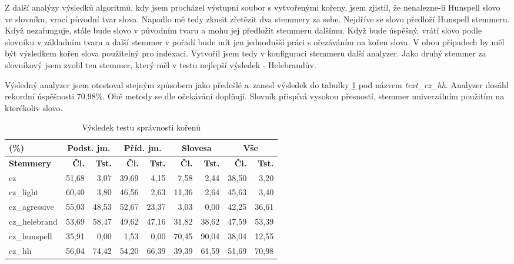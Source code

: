 Z další analýzy výsledků algoritmů, kdy jsem procházel výstupní soubor s vytvořenými kořeny, jsem zjistil, že nenalezne-li Hunspell slovo ve slovníku, vrací původní tvar slova. Napadlo mě tedy zkusit zřetězit dva stemmery za sebe. Nejdříve se slovo předloží Hunspell stemmeru. Když nezafunguje, stále bude slovo v původním tvaru a mohu jej předložit stemmeru dalšímu. Když bude úspěšný, vrátí slovo podle slovníku v základním tvaru a další stemmer v pořadí bude mít jen jednodušší práci s ořezáváním na kořen slova. V obou případech by měl být výsledkem kořen slova použitelný pro indexaci. Vytvořil jsem tedy v konfiguraci stemmeru další analyzer. Jako druhý stemmer za slovníkový jsem zvolil ten stemmer, který měl v testu nejlepší výsledek - Helebrandův.

Výsledný analyzer jsem otestoval stejným způsobem jako předešlé a~zanesl výsledek do tabulky \ref{tab:test_stm} pod názvem \emph{text\_cz\_hh}. Analyzer dosáhl rekordní úspěšnosti 70,98\%. Obě metody se dle očekávání doplňují. Slovník přispívá vysokou přesností, stemmer univerzálním použitím na kterékoliv slovo.

\begin{table}
\begin{center}
\begin{tabular}{|l|r|r|r|r|r|r|r|r|}
\hline
(\%) & \multicolumn{2}{|c|}{\textbf{Podst. jm.}} & \multicolumn{2}{|c|}{\textbf{Příd. jm.}} & \multicolumn{2}{|c|}{\textbf{Slovesa}} & \multicolumn{2}{|c|}{\textbf{Vše}} \\ \hline
\textbf{Stemmery} & \textbf{Čl.} & \textbf{Tst.} & \textbf{Čl.} & \textbf{Tst.} & \textbf{Čl.} & \textbf{Tst.} & \textbf{Čl.} & \textbf{Tst.} \\ \hline
cz & 51,68 & 3,07 & 39,69 & 4,15 & 7,58 & 2,44 & 38,50 & 3,20 \\ \hline
cz\_light & 60,40 & 3,80 & 46,56 & 2,63 & 11,36 & 2,64 & 45,63 & 3,40 \\ \hline
cz\_agressive & 55,03 & 48,53 & 52,67 & 23,37 & 3,03 & 0,00 & 42,25 & 36,61 \\ \hline
cz\_helebrand & 53,69 & 58,47 & 49,62 & 47,16 & 31,82 & 38,62 & 47,59 & 53,39 \\ \hline
cz\_hunspell & 35,91 & 0,00 & 1,53 & 0,00 & 70,45 & 90,04 & 38,04 & 12,55 \\ \hline
\hline
cz\_hh & 56,04 & 74,42 & 54,20 & 66,39 & 39,39 & 61,59 & 51,69 & 70,98 \\ \hline
\end{tabular}
\end{center}
\caption{Výsledek testu správnosti kořenů}
\label{tab:test_stm}
\end{table}

